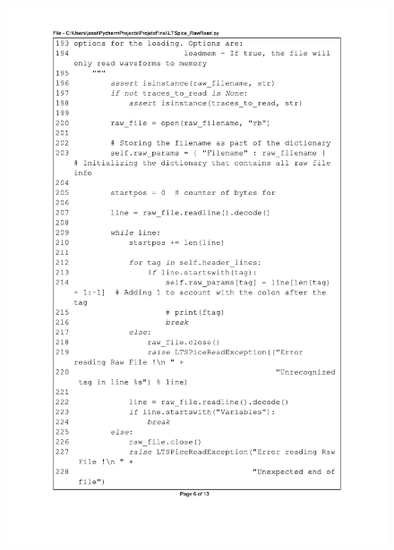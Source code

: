 \begin{figure}[]
\centering
\includegraphics[scale=0.9]{01_Pre_textuais/code/leitura6.pdf}
\end{figure}

